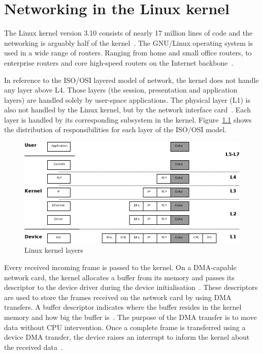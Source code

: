 
\chapter{Networking in the Linux kernel}\label{chap:linux}
The Linux kernel version 3.10 consists of nearly 17 million lines of code
and the networking is arguably half of the kernel~\cite{linux-by-numbers}.
The GNU/Linux operating system is used in a wide range of routers.
Ranging from home and small office routers, to enterprise routers and
core high-speed routers on the Internet backbone~\cite{linux-by-numbers}.

In reference to the ISO/OSI layered model of network,
the kernel does not handle any layer above L4.
Those layers (the session, presentation and application layers) are
handled solely by user-space applications.
The physical layer (L1) is also not handled by the Linux kernel,
but by the network interface card~\cite{linux-kernel-networking}.
Each layer is handled by its corresponding subsystem in the kernel.
Figure~\ref{fig:linux-layers} shows the distribution of responsibilities for each layer of the ISO/OSI model.

\begin{figure}[H]
	\bigskip
	\centering
	\includegraphics[width=14cm,keepaspectratio]{fig/layers.png}
	\caption{Linux kernel layers}
	\label{fig:linux-layers}
	\bigskip
\end{figure}

Every received incoming frame is passed to the kernel.
On a DMA-capable network card, the kernel allocates a buffer from its memory and passes its descriptor to the
device driver during the device initialisation~\cite{tcpip-in-linux}.
These descriptors are used to store the frames received on the network card by using DMA transfers.
A buffer descriptor indicates where the buffer resides in the kernel memory and how big the buffer is~\cite{tcpip-in-linux}.
The purpose of the DMA transfer is to move data without CPU intervention.
Once a complete frame is transferred using a device DMA transfer,
the device raises an interrupt to inform the kernel about the received data~\cite{tcpip-in-linux}.

